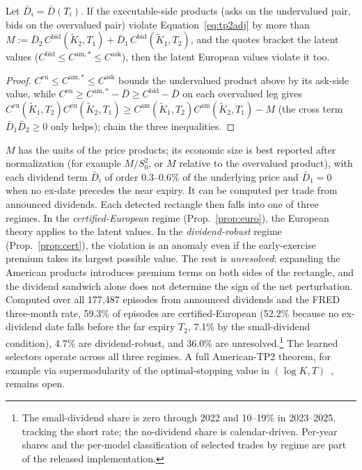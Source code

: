\documentclass[sigconf,review,anonymous]{acmart}
\begin{document}
\begin{proposition}\label{prop:cert}
Let $\bar D_i=\bar D(T_i)$. If the executable-side products (asks on the undervalued pair, bids on the overvalued pair) violate Equation~\eqref{eq:tp2adj} by more than $M:=\bar D_2\,C^{\mathrm{bid}}(\tilde K_2,T_1)+\bar D_1\,C^{\mathrm{bid}}(\tilde K_1,T_2)$, and the quotes bracket the latent values ($C^{\mathrm{bid}}\le C^{\mathrm{am},*}\le C^{\mathrm{ask}}$), then the latent European values violate it too.
\end{proposition}
\begin{proof}
$C^{\mathrm{eu}}\!\le\!C^{\mathrm{am},*}\!\le\!C^{\mathrm{ask}}$ bounds the undervalued product above by its ask-side value, while $C^{\mathrm{eu}}\!\ge\!C^{\mathrm{am},*}-\bar D\ge C^{\mathrm{bid}}-\bar D$ on each overvalued leg gives $C^{\mathrm{eu}}(\tilde K_1,T_2)C^{\mathrm{eu}}(\tilde K_2,T_1)\ge C^{\mathrm{am}}(\tilde K_1,T_2)C^{\mathrm{am}}(\tilde K_2,T_1)-M$ (the cross term $\bar D_1\bar D_2\ge0$ only helps); chain the three inequalities.
\end{proof}
\noindent $M$ has the units of the price products; its economic size is best reported after normalization (for example $M/S_0^2$, or $M$ relative to the overvalued product), with each dividend term $\bar D_i$ of order $0.3$--$0.6\%$ of the underlying price and $\bar D_1=0$ when no ex-date precedes the near expiry. It can be computed per trade from announced dividends. Each detected rectangle then falls into one of three regimes. In the \emph{certified-European} regime (Prop.~\ref{prop:euro}), the European theory applies to the latent values. In the \emph{dividend-robust} regime (Prop.~\ref{prop:cert}), the violation is an anomaly even if the early-exercise premium takes its largest possible value. The rest is \emph{unresolved}: expanding the American products introduces premium terms on both sides of the rectangle, and the dividend sandwich alone does not determine the sign of the net perturbation. Computed over all 177{,}487 episodes from announced dividends and the FRED three-month rate, 59.3\% of episodes are certified-European (52.2\% because no ex-dividend date falls before the far expiry $T_2$, 7.1\% by the small-dividend condition), 4.7\% are dividend-robust, and 36.0\% are unresolved.\footnote{The small-dividend share is zero through 2022 and 10--19\% in 2023--2025, tracking the short rate; the no-dividend share is calendar-driven. Per-year shares and the per-model classification of selected trades by regime are part of the released implementation.} The learned selectors operate across all three regimes. A full American-TP2 theorem, for example via supermodularity of the optimal-stopping value in $(\log K,T)$~\cite{topkis1998}, remains open.
\end{document}
